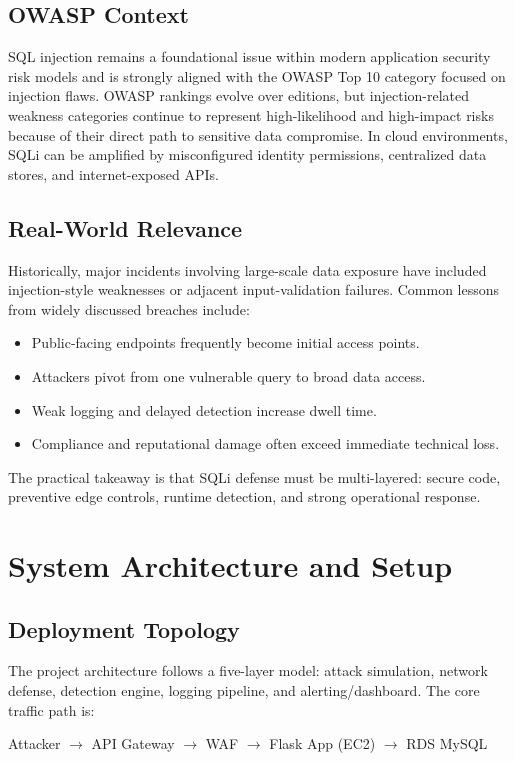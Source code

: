 \documentclass[12pt,a4paper]{article}
\begin{document}
\subsection{OWASP Context}
SQL injection remains a foundational issue within modern application security risk models and is strongly aligned with the OWASP Top 10 category focused on injection flaws. OWASP rankings evolve over editions, but injection-related weakness categories continue to represent high-likelihood and high-impact risks because of their direct path to sensitive data compromise. In cloud environments, SQLi can be amplified by misconfigured identity permissions, centralized data stores, and internet-exposed APIs.

\subsection{Real-World Relevance}
Historically, major incidents involving large-scale data exposure have included injection-style weaknesses or adjacent input-validation failures. Common lessons from widely discussed breaches include:
\begin{itemize}
  \item Public-facing endpoints frequently become initial access points.
  \item Attackers pivot from one vulnerable query to broad data access.
  \item Weak logging and delayed detection increase dwell time.
  \item Compliance and reputational damage often exceed immediate technical loss.
\end{itemize}

The practical takeaway is that SQLi defense must be multi-layered: secure code, preventive edge controls, runtime detection, and strong operational response.

\section{System Architecture and Setup}
\subsection{Deployment Topology}
The project architecture follows a five-layer model: attack simulation, network defense, detection engine, logging pipeline, and alerting/dashboard. The core traffic path is:
\begin{center}
Attacker $\rightarrow$ API Gateway $\rightarrow$ WAF $\rightarrow$ Flask App (EC2) $\rightarrow$ RDS MySQL
\end{center}
\end{document}
